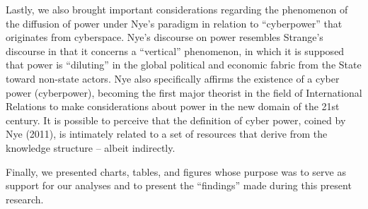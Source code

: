 Lastly, we also brought important considerations regarding the phenomenon of the diffusion of power under Nye's paradigm in relation to ``cyberpower'' that originates from cyberspace. Nye's discourse on power resembles Strange's discourse in that it concerns a ``vertical'' phenomenon, in which it is supposed that power is ``diluting'' in the global political and economic fabric from the State toward non-state actors. Nye also specifically affirms the existence of a cyber power (cyberpower), becoming the first major theorist in the field of International Relations to make considerations about power in the new domain of the 21st century. It is possible to perceive that the definition of cyber power, coined by Nye (2011), is intimately related to a set of resources that derive from the knowledge structure -- albeit indirectly.

Finally, we presented charts, tables, and figures whose purpose was to serve as support for our analyses and to present the ``findings'' made during this present research.
